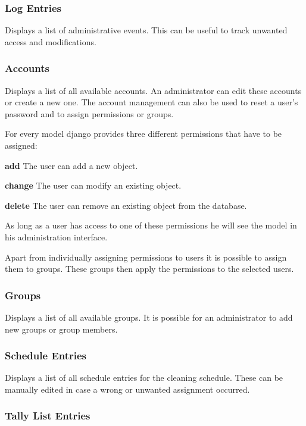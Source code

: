 \subsubsection{Log Entries}\label{log-entries}

Displays a list of administrative events. This can be useful to track
unwanted access and modifications.

\subsubsection{Accounts}\label{accounts}

Displays a list of all available accounts. An administrator can edit
these accounts or create a new one. The account management can also be
used to reset a user's password and to assign permissions or groups.

For every model django provides three different permissions that have to
be assigned:

\textbf{add} The user can add a new object.

\textbf{change} The user can modify an existing object.

\textbf{delete} The user can remove an existing object from the
database.

As long as a user has access to one of these permissions he will see the
model in his administration interface.

Apart from individually assigning permissions to users it is possible to
assign them to groups. These groups then apply the permissions to the
selected users.

\subsubsection{Groups}\label{groups}

Displays a list of all available groups. It is possible for an
administrator to add new groups or group members.

\subsubsection{Schedule Entries}\label{schedule-entries}

Displays a list of all schedule entries for the cleaning schedule. These
can be manually edited in case a wrong or unwanted assignment occurred.

\subsubsection{Tally List Entries}\label{tally-list-entries}

